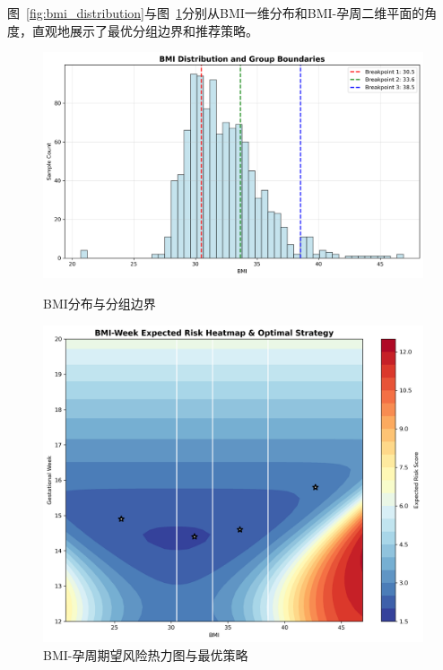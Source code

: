 图~\ref{fig:bmi_distribution}与图~\ref{fig:bmi_week_heatmap}分别从BMI一维分布和BMI-孕周二维平面的角度，直观地展示了最优分组边界和推荐策略。

\begin{figure}[htbp]
    \centering
    \begin{minipage}{0.48\textwidth}
        \centering
        \includegraphics[width=\textwidth]{q2/bmi_distribution_with_boundaries.png}
        \caption{BMI分布与分组边界}
        \label{fig:bmi_distribution}
    \end{minipage}
    \hfill
    \begin{minipage}{0.48\textwidth}
        \centering
        \includegraphics[width=\textwidth]{q2/bmi_week_risk_heatmap.png}
        \caption{BMI-孕周期望风险热力图与最优策略}
        \label{fig:bmi_week_heatmap}
    \end{minipage}
\end{figure}


